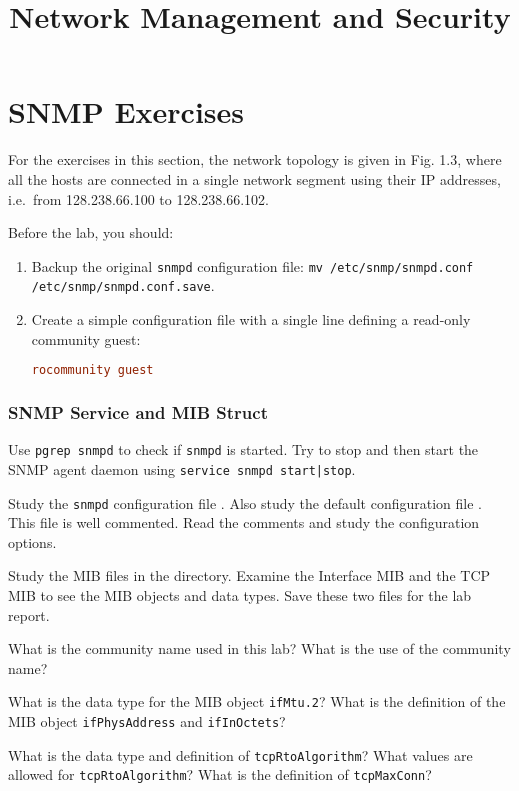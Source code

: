 \documentclass{../UTNetLab}
\title{Network Management and Security}
\begin{document}
\part{SNMP Exercises}
    For the exercises in this section, the network topology is given in Fig. 1.3, where all the hosts are connected in a single network segment using their IP addresses, i.e.\  from 128.238.66.100 to 128.238.66.102.

    Before the lab, you should:
    \begin{enumerate}
        \item Backup the original \lstinline{snmpd} configuration file:
        \lstinline{mv /etc/snmp/snmpd.conf /etc/snmp/snmpd.conf.save}.
        \item Create a simple configuration file  with a single line defining a read-only community guest:
        \begin{lstlisting}[language={conf}]
rocommunity guest
        \end{lstlisting}
    \end{enumerate}

\section{SNMP Service and MIB Struct}
    Use \lstinline{pgrep snmpd} to check if \lstinline{snmpd} is started. Try to stop and then start the SNMP agent daemon using \lstinline{service snmpd start|stop}.

    Study the \lstinline{snmpd} configuration file . Also study the default configuration file . This file is well commented. Read the comments and study the configuration options.

    Study the MIB files in the  directory. Examine the Interface MIB  and the TCP MIB  to see the MIB objects and data types. Save these two files for the lab report.

    \begin{report}
    \item What is the community name used in this lab? What is the use of the
    community name?
    
    \item What is the data type for the MIB object \texttt{ifMtu.2}? What is the definition of the MIB object \texttt{ifPhysAddress} and \texttt{ifInOctets}?
    
    \item What is the data type and definition of \texttt{tcpRtoAlgorithm}? What values are allowed for \texttt{tcpRtoAlgorithm}? What is the definition of \texttt{tcpMaxConn}?
    \end{report}
\end{document}
